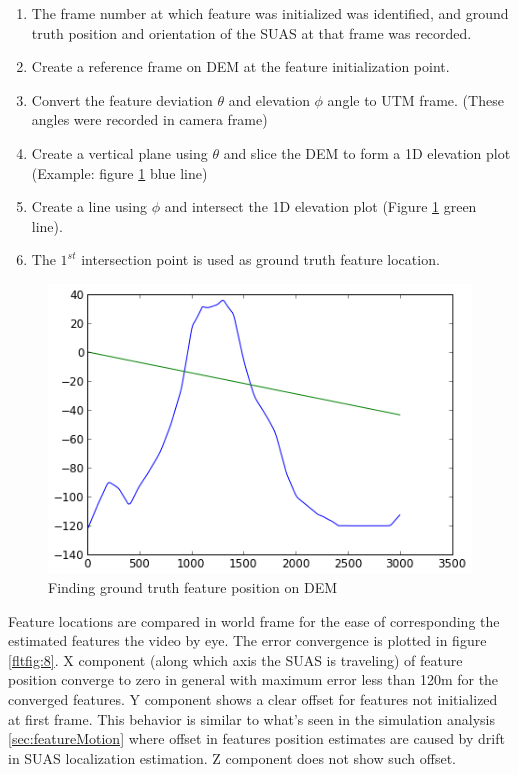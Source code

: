 \begin{enumerate}
  \item The frame number at which feature was initialized was
  identified, and ground truth position and orientation of the SUAS at
  that frame was recorded.
  \item Create a reference frame on DEM at the feature initialization point.
  \item Convert the feature deviation $\theta$ and elevation $\phi$
  angle to UTM frame. (These angles were recorded in camera frame)
  \item Create a vertical plane using $\theta$ and slice the DEM to
  form a 1D elevation plot (Example: figure \ref{fltfig:7} blue line)
  \item Create a line using $\phi$ and intersect the 1D elevation plot
  (Figure \ref{fltfig:7} green line). 
  \item The $1^{st}$ intersection point is used as ground truth
  feature location.
\end{enumerate}

\begin{figure}[h]
\centering
\includegraphics[width=12cm, keepaspectratio=true]
{./Figures/fltfig/cut1/intersect0_0.png}
\caption{Finding ground truth feature position on DEM}
\label{fltfig:7}
\end{figure}

Feature locations are compared in world frame for the ease of
corresponding the estimated features the video by eye. The error
convergence is plotted in figure \ref{fltfig:8}. X component (along
which axis the SUAS is traveling) of feature position converge to zero
in general with maximum error less than 120m for the converged
features. Y component shows a clear offset for features not
initialized at first frame. This behavior is similar to what's seen in
the simulation analysis \ref{sec:featureMotion} where offset in
features position estimates are caused by drift in SUAS localization
estimation. Z component does not show such offset.

